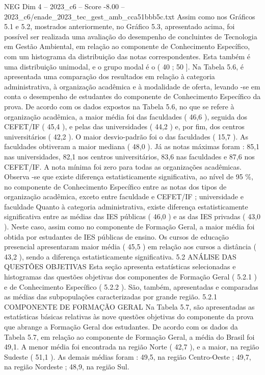 \begin{textsample}{NEG Dim 4 – 2023\_c6 – Score -8.00 – 2023\_c6/enade\_2023\_tec\_gest\_amb\_cca51bbb5c.txt}
Assim como nos Gráficos 5.1 e 5.2, mostrados anteriormente, no Gráfico 5.3, apresentado acima, foi possível ser realizada uma avaliação do desempenho de concluintes de Tecnologia em Gestão Ambiental, em relação ao componente de Conhecimento Específico, com um histograma da distribuição das notas correspondentes.
Esta também é uma distribuição unimodal, e o grupo modal é o ( 40 ; 50 ].
Na Tabela 5.6, é apresentada uma comparação dos resultados em relação à categoria administrativa, à organização acadêmica e à modalidade de oferta, levando -se em conta o desempenho de estudantes do componente de Conhecimento Específico da prova.
De acordo com os dados expostos na Tabela 5.6, no que se refere à organização acadêmica, a maior média foi das faculdades ( 46,6 ), seguida dos CEFET/IF ( 45,4 ), e pelas das universidades ( 44,2 ) e, por fim, dos centros universitários ( 42,2 ).
O maior desvio-padrão foi o das faculdades ( 15,7 ).
As faculdades obtiveram a maior mediana ( 48,0 ).
Já as notas máximas foram : 85,1 nas universidades, 82,1 nos centros universitários, 83,6 nas faculdades e 87,6 nos CEFET/IF.
A nota mínima foi zero para todas as organizações acadêmicas.
Observa -se que existe diferença estatisticamente significativa, ao nível de 95 \%, no componente de Conhecimento Específico entre as notas dos tipos de organização acadêmica, exceto entre faculdade e CEFET/IF ; universidade e faculdade Quanto à categoria administrativa, existe diferença estatisticamente significativa entre as médias das IES públicas ( 46,0 ) e as das IES privadas ( 43,0 ).
Neste caso, assim como no componente de Formação Geral, a maior média foi obtida por estudantes de IES públicas de ensino.
Os cursos de educação presencial apresentaram maior média ( 45,5 ) em relação aos cursos a distância ( 43,2 ), sendo a diferença estatisticamente significativa. 5.2 ANÁLISE DAS QUESTÕES OBJETIVAS Esta seção apresenta estatísticas selecionadas e histogramas das questões objetivas dos componentes de Formação Geral ( 5.2.1 ) e de Conhecimento Específico ( 5.2.2 ).
São, também, apresentadas e comparadas as médias das subpopulações caracterizadas por grande região. 5.2.1 COMPONENTE DE FORMAÇÃO GERAL Na Tabela 5.7, são apresentadas as estatísticas básicas relativas às nove questões objetivas do componente da prova que abrange a Formação Geral dos estudantes.
De acordo com os dados da Tabela 5.7, em relação ao componente de Formação Geral, a média do Brasil foi 49,1.
A menor média foi encontrada na região Norte ( 42,7 ), e a maior, na região Sudeste ( 51,1 ).
As demais médias foram : 49,5, na região Centro-Oeste ; 49,7, na região Nordeste ; 48,9, na região Sul.

\end{textsample}
